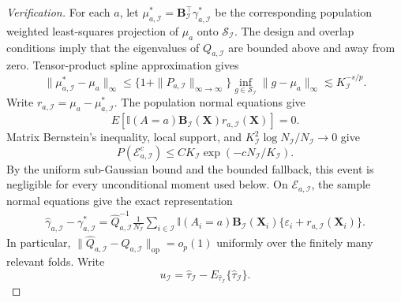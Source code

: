 \documentclass[11pt]{article}
\theoremstyle{referenceplain}
\theoremstyle{referencedefinition}
\theoremstyle{referenceremark}
\begin{document}
\begin{proof}[Verification]
For each $a$, let $\mu_{a,\mathcal I}^{*}
=\mathbf B_{\mathcal I}^{\top}\gamma_{a,\mathcal I}^{*}$ be the corresponding population weighted least-squares projection of $\mu_a$ onto $\mathcal S_{\mathcal I}$. The design and overlap conditions imply that the eigenvalues of $Q_{a,\mathcal I}$ are bounded above and away from zero. Tensor-product spline approximation gives
\begin{equation}
\|\mu_{a,\mathcal I}^{*}-\mu_a\|_\infty
\le\{1+\|P_{a,\mathcal I}\|_{\infty\to\infty}\}
\inf_{g\in\mathcal S_{\mathcal I}}\|g-\mu_a\|_\infty
\lesssim K_{\mathcal I}^{-s/p}.
\label{spline-projection-bias}
\end{equation}
Write $r_{a,\mathcal I}=\mu_a-\mu_{a,\mathcal I}^{*}$. The population normal equations give
\[
E\left[\mathbb I(A=a)\mathbf B_{\mathcal I}(\mathbf X)
r_{a,\mathcal I}(\mathbf X)\right]=0.
\]
Matrix Bernstein's inequality, local support, and
$K_{\mathcal I}^2\log N_{\mathcal I}/N_{\mathcal I}\to0$ give
\[
P(\mathcal E_{a,\mathcal I}^{c})
\le C K_{\mathcal I}\exp(-cN_{\mathcal I}/K_{\mathcal I}).
\]
By the uniform sub-Gaussian bound and the bounded fallback, this event is
negligible for every unconditional moment used below. On
$\mathcal E_{a,\mathcal I}$, the sample normal
equations give the exact representation
\begin{align}
\widehat\gamma_{a,\mathcal I}-\gamma_{a,\mathcal I}^{*}
=\widehat Q_{a,\mathcal I}^{-1}
\frac1{N_{\mathcal I}}
\sum_{i\in\mathcal I}\mathbb I(A_i=a)
\mathbf B_{\mathcal I}(\mathbf X_i)
\{\varepsilon_i+r_{a,\mathcal I}(\mathbf X_i)\}.
\label{spline-normal-equation}
\end{align}
In particular,
$\|\widehat Q_{a,\mathcal I}-Q_{a,\mathcal I}\|_{\mathrm{op}}=o_p(1)$
uniformly over the finitely many relevant folds. Write
\[
u_{\mathcal I}
=\widehat\tau_{\mathcal I}
-E_{\widehat\tau_{\mathcal I}}
\{\widehat\tau_{\mathcal I}\}.
\]


\end{proof}
\end{document}
